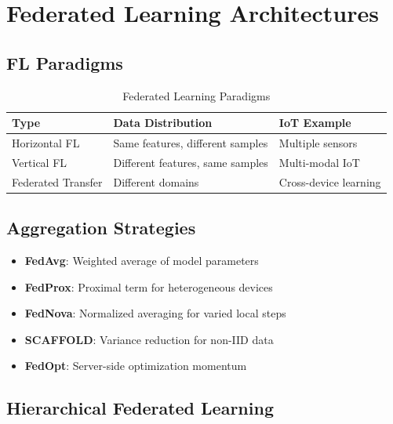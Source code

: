 \documentclass[12pt,a4paper]{article}
\begin{document}
\section{Federated Learning Architectures}

\subsection{FL Paradigms}

\begin{table}[H]
\centering
\caption{Federated Learning Paradigms}
\begin{tabular}{lll}
\toprule
\textbf{Type} & \textbf{Data Distribution} & \textbf{IoT Example} \\
\midrule
Horizontal FL & Same features, different samples & Multiple sensors \\
Vertical FL & Different features, same samples & Multi-modal IoT \\
Federated Transfer & Different domains & Cross-device learning \\
\bottomrule
\end{tabular}
\end{table}

\subsection{Aggregation Strategies}

\begin{tcolorbox}[colback=flblue!10, colframe=flblue, title=FL Aggregation Methods]
\begin{itemize}
    \item \textbf{FedAvg}: Weighted average of model parameters
    \item \textbf{FedProx}: Proximal term for heterogeneous devices
    \item \textbf{FedNova}: Normalized averaging for varied local steps
    \item \textbf{SCAFFOLD}: Variance reduction for non-IID data
    \item \textbf{FedOpt}: Server-side optimization momentum
\end{itemize}
\end{tcolorbox}

\subsection{Hierarchical Federated Learning}
\end{document}
